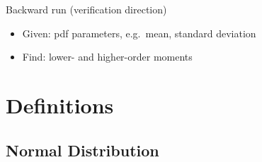 \documentclass[10pt]{beamer}
\numberwithin{equation}{section}
\begin{document}
    \begin{frame}{Backward run (verification direction)}
        \begin{itemize}
            [<+->]
            \item Given: pdf parameters, e.g.\ mean, standard deviation
            \item Find: lower- and higher-order moments
        \end{itemize}
    \end{frame}


    \section{Definitions}\label{sec:definitions}

    \subsection{Normal Distribution}\label{subsec:normal-distribution}
\end{document}
